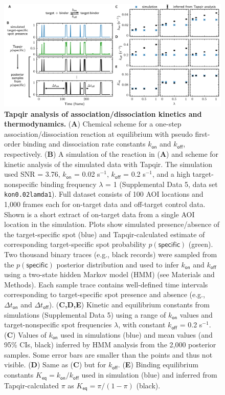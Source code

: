 \begin{figure}
\begin{fullwidth}
\includegraphics[width=183mm]{figures/kinetic_analysis.png}
\caption{\textbf{Tapqir analysis of association/dissociation kinetics and thermodynamics.} (\textbf{A}) Chemical scheme for a one-step association/dissociation reaction at equilibrium with pseudo first-order binding and dissociation rate constants $k_{\mathsf{on}}$ and $k_{\mathsf{off}}$, respectively. (\textbf{B}) A simulation of the reaction in (\textbf{A}) and scheme for kinetic analysis of the simulated data with Tapqir. The simulation used SNR = 3.76, $k_\mathsf{on}$ = 0.02 s$^{-1}$, $k_\mathsf{off}$ = 0.2 s$^{-1}$, and a high target-nonspecific binding frequency $\lambda$ = 1 (Supplemental Data 5, data set \texttt{kon0.02lamda1}). Full dataset consists of 100 AOI locations and 1,000 frames each for on-target data and off-target control data. Shown is a short extract of on-target data from a single AOI location in the simulation.  Plots show simulated presence/absence of the target-specific spot (blue) and Tapqir-calculated estimate of corresponding target-specific spot probability $p(\mathsf{specific})$ (green). Two thousand binary traces (e.g., black records) were sampled from the $p(\mathsf{specific})$ posterior distribution and used to infer $k_\mathsf{on}$ and $k_\mathsf{off}$ using a two-state hidden Markov model (HMM) (see Materials and Methods). Each sample trace contains well-defined time intervals corresponding to target-specific spot presence and absence (e.g., $\Delta t_\mathsf{on}$ and $\Delta t_\mathsf{off}$). (\textbf{C,D,E}) Kinetic and equilibrium constants from simulations (Supplemental Data 5) using a range of $k_\mathsf{on}$ values and  target-nonspecific spot frequencies $\lambda$, with constant $k_\mathsf{off}$ = 0.2 s$^{-1}$. (\textbf{C}) Values of $k_{\mathsf{on}}$ used in simulations (blue) and mean values (and 95\% CIs, black) inferred by HMM analysis from the 2,000 posterior samples.  Some error bars are smaller than the points and thus not visible. (\textbf{D}) Same as (\textbf{C}) but for $k_{\mathsf{off}}$. (\textbf{E})  Binding equilibrium constants $K_{\mathsf{eq}} = k_{\mathsf{on}} / k_{\mathsf{off}}$ used in simulation (blue) and inferred from Tapqir-calculated $\pi$ as $K_{\mathsf{eq}} = \pi / (1 - \pi)$ (black). }
\label{fig:kinetic_analysis}
\end{fullwidth}
\end{figure}